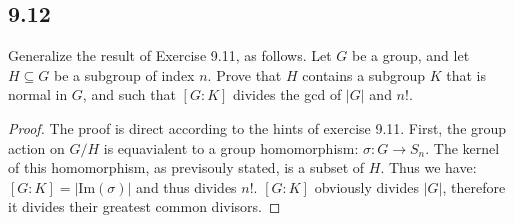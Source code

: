 \documentclass[a4paper, pdf, 12pt]{article}
\begin{document}
\subsection*{9.12}
Generalize the result of Exercise 9.11, as follows. Let $G$ be a group, and
let $H \subseteq G$ be a subgroup of index $n$. Prove that $H$ contains a subgroup $K$ that is
normal in $G$, and such that $[G : K]$ divides the gcd of $\lvert G\rvert$ and $n!$.
\begin{proof}
  The proof is direct according to the hints of exercise 9.11. First, the group action on 
  $G/H$ is equavialent to a group homomorphism: $\sigma: G\rightarrow S_{n}$. The kernel of this
  homomorphism, as previsouly stated, is a subset of $H$. Thus we have: $[G:K] = \lvert \mbox{Im}(\sigma)\rvert$
  and thus divides $n!$. $[G:K]$ obviously divides $\lvert G\rvert$, therefore it divides their greatest common divisors.
\end{proof}
\end{document}
